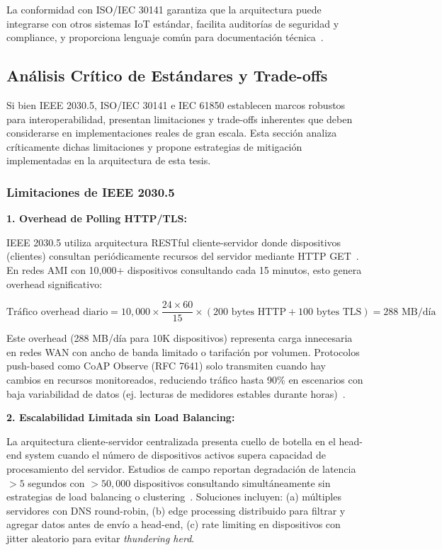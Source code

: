 La conformidad con ISO/IEC 30141 garantiza que la arquitectura puede integrarse con otros sistemas IoT estándar, facilita auditorías de seguridad y compliance, y proporciona lenguaje común para documentación técnica~\cite{tangResearchInteroperabilityIoT,choudharyInternetThingsComprehensive2024}.

\subsection{Análisis Crítico de Estándares y Trade-offs}
\label{sec:standards-tradeoffs}

Si bien IEEE 2030.5, ISO/IEC 30141 e IEC 61850 establecen marcos robustos para interoperabilidad, presentan limitaciones y trade-offs inherentes que deben considerarse en implementaciones reales de gran escala. Esta sección analiza críticamente dichas limitaciones y propone estrategias de mitigación implementadas en la arquitectura de esta tesis.

\subsubsection{Limitaciones de IEEE 2030.5}

\textbf{1. Overhead de Polling HTTP/TLS:}

IEEE 2030.5 utiliza arquitectura RESTful cliente-servidor donde dispositivos (clientes) consultan periódicamente recursos del servidor mediante HTTP GET~\cite{IEEERecommendedPractice}. En redes AMI con 10,000+ dispositivos consultando cada 15 minutos, esto genera overhead significativo:

\begin{equation}
\text{Tráfico overhead diario} = 10{,}000 \times \frac{24 \times 60}{15} \times (200\text{ bytes HTTP} + 100\text{ bytes TLS}) = 288\text{ MB/día}
\label{eq:ieee2030-overhead}
\end{equation}

Este overhead (288 MB/día para 10K dispositivos) representa carga innecesaria en redes WAN con ancho de banda limitado o tarifación por volumen. Protocolos push-based como CoAP Observe (RFC 7641) solo transmiten cuando hay cambios en recursos monitoreados, reduciendo tráfico hasta 90\% en escenarios con baja variabilidad de datos (ej. lecturas de medidores estables durante horas)~\cite{shelby6LoWPANWirelessEmbedded2009}.

\textbf{2. Escalabilidad Limitada sin Load Balancing:}

La arquitectura cliente-servidor centralizada presenta cuello de botella en el head-end system cuando el número de dispositivos activos supera capacidad de procesamiento del servidor. Estudios de campo reportan degradación de latencia $>5$ segundos con $>50,000$ dispositivos consultando simultáneamente sin estrategias de load balancing o clustering~\cite{alsafranChallengesImplementingIoT2025}. Soluciones incluyen: (a) múltiples servidores con DNS round-robin, (b) edge processing distribuido para filtrar y agregar datos antes de envío a head-end, (c) rate limiting en dispositivos con jitter aleatorio para evitar \textit{thundering herd}.

